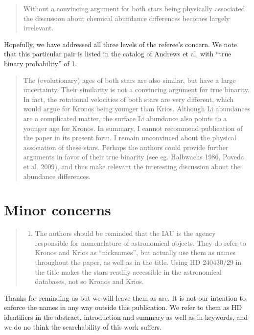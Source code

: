 \documentclass[12pt]{article}
\begin{document}
\begin{quote}
Without a convincing argument for both stars being physically associated
the discussion about chemical abundance differences becomes largely
irrelevant.
\end{quote}

Hopefully, we have addressed all three levels of the referee's concern.
We note that this particular pair is listed in the catalog of Andrews et al.
with ``true binary probability'' of 1.


\begin{quote}
The (evolutionary) ages of both stars are also similar, but have a large
uncertainty. Their similarity is not a convincing argument for true
binarity.
In fact, the rotational velocities of both stars are very different,
which would argue for Kronos being younger than Krios. Although Li
abundances are a complicated matter, the surface Li abundance also
points to a younger age for Kronos. In summary, I cannot recommend
publication of the paper in its present form. I remain unconvinced about
the physical association of these stars. Perhaps the authors could
provide further arguments in favor of their true binarity (see eg.
Halbwachs 1986, Poveda et al. 2009), and thus make relevant the
interesting discussion about the abundance differences.
\end{quote}


\section*{Minor concerns}\label{minor-concerns}

\begin{quote}
\begin{enumerate}
\def\labelenumi{\arabic{enumi}.}
\itemsep1pt\parskip0pt
\item
  The authors should be reminded that the IAU is the agency responsible
  for nomenclature of astronomical objects. They do refer to Kronos and
  Krios as ``nicknames'', but actually use them as names throughout the
  paper, as well as in the title. Using HD 240430/29 in the title makes
  the stars readily accessible in the astronomical databases, not so
  Kronos and Krios.
\end{enumerate}
\end{quote}

Thanks for reminding us but we will leave them as are. It is not our intention
to enforce the names in any way outside this publication. We refer to them as HD
identifiers in the abstract, introduction and summary as well as in keywords,
and we do no think the searchability of this work suffers.
\end{document}
